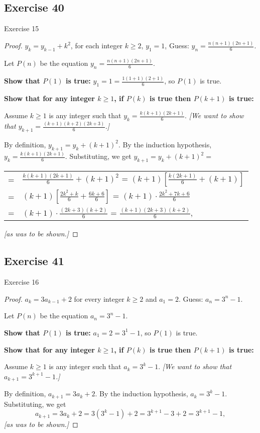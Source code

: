 \documentclass[14pt]{extarticle}
\newcommand{\dps}{\displaystyle}
\begin{document}
\subsection{Exercise 40}
Exercise 15

\begin{proof}
    \(y_k = y_{k-1} + k^2\), for each integer \(k \geq 2\),
    \(y_1 = 1\), Guess: \(y_n = \dps \frac{n(n+1)(2n+1)}{6}\).

    Let $P(n)$ be the equation \(y_n = \dps \frac{n(n+1)(2n+1)}{6}\).

        {\bf Show that \(P(1)\) is true:} \(y_1 = 1 = \dps \frac{1(1+1)(2+1)}{6}\), so $P(1)$ is true.

        {\bf Show that for any integer \(k \geq 1\), if \(P(k)\) is true then \(P(k+1)\) is true:}

    Assume \(k \geq 1\) is any integer such that \(y_k = \dps \frac{k(k+1)(2k+1)}{6}\).
        {\it [We want to show that \(y_{k+1} = \dps \frac{(k+1)(k+2)(2k+3)}{6}\).]}

    By definition, \(y_{k+1} = y_k + (k+1)^2\).
    By the induction hypothesis, \(y_k = \dps \frac{k(k+1)(2k+1)}{6}\).
    Substituting, we get \(y_{k+1} = y_k + (k+1)^2 =\)

    \begin{tabular}{rl}
        = & \(\dps \frac{k(k+1)(2k+1)}{6} + (k+1)^2\)
        = \(\dps (k+1)\left[\frac{k(2k+1)}{6} + (k+1)\right]\)           \\
        = & \(\dps (k+1)\left[\frac{2k^2+k}{6} + \frac{6k+6}{6}\right]\)
        = \(\dps (k+1) \cdot \frac{2k^2+7k+6}{6}\)                       \\
        = & \(\dps (k+1) \cdot \frac{(2k+3)(k+2)}{6}\)
        = \(\dps \frac{(k+1)(2k+3)(k+2)}{6}\),
    \end{tabular}

    {\it [as was to be shown.]}
\end{proof}

\subsection{Exercise 41}
Exercise 16

\begin{proof}
    \(a_k = 3a_{k-1} + 2\) for every integer \(k \geq 2\) and \(a_1 = 2\). Guess: \(a_n = 3^n - 1\).

    Let $P(n)$ be the equation \(a_n = 3^n - 1\).

        {\bf Show that \(P(1)\) is true:} \(a_1 = 2 = 3^1 - 1\), so $P(1)$ is true.

        {\bf Show that for any integer \(k \geq 1\), if \(P(k)\) is true then \(P(k+1)\) is true:}

    Assume \(k \geq 1\) is any integer such that \(a_k = 3^k - 1\).
        {\it [We want to show that \(a_{k+1} = 3^{k+1} - 1\).]}

    By definition, \(a_{k+1} = 3a_k + 2\).
    By the induction hypothesis, \(a_k = 3^k - 1\).
    Substituting, we get
    \[
        a_{k+1} = 3a_k + 2 = 3(3^k - 1) + 2 = 3^{k+1} - 3 + 2 = 3^{k+1} - 1,
    \]
    {\it [as was to be shown.]}
\end{proof}
\end{document}
